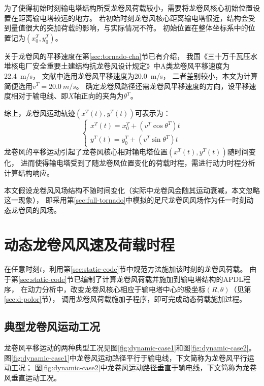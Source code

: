 为了使得初始时刻输电塔结构所受龙卷风荷载较小，需要将龙卷风核心初始位置设置在距离输电塔较远的地方。
若初始时刻龙卷风核心距离输电塔很近，结构会受到量值很大的突加荷载的影响，与实际情况不符。
初始位置在整体坐标系中的位置记为$\left(x^T_{0},y^T_{0}\right)$。

关于龙卷风的平移速度在第\ref{sec:tornado-cha}节已有介绍，
我国《三十万千瓦压水堆核电厂安全重要土建结构抗龙卷风设计规定》中A类龙卷风平移速度为\SI{22.4}{m/s}，
文献\cite{savory2001modelling}\cite{hamada2011behaviour}中选用龙卷风平移速度为\SI{20.0}{m/s}，
二者差别较小，本文为计算简便选用$v^T=\SI{20.0}{m/s}$。
确定龙卷风路径还需龙卷风平移速度的方向，设平移速度相对于输电线、即$X$轴正向的夹角为$\theta^T$。

综上，龙卷风运动轨迹$\left(x^T(t),y^T(t)\right)$可表示为：
\begin{equation}
	\begin{cases}
		x^T(t) = x^T_0 + \left(v^T\cos{\theta^T}\right)t \\
		y^T(t) = y^T_0 + \left(v^T\sin{\theta^T}\right)t 
	\end{cases}
\end{equation}
龙卷风的平移运动引起了龙卷风核心相对输电塔位置$\left(x^T(t),y^T(t)\right)$随时间变化，
进而使得输电塔受到了随龙卷风位置变化的荷载时程，需进行动力时程分析计算结构响应。

本文假设龙卷风风场结构不随时间变化（实际中龙卷风会随其运动衰减，本文忽略这一现象），
即采用第\ref{sec:full-tornado}中模拟的足尺龙卷风风场作为任一时刻动态龙卷风的风场。

\section{动态龙卷风风速及荷载时程}

在任意时刻$t$，利用第\ref{sec:static-code}节中规范方法施加该时刻的龙卷风荷载。
由于第\ref{sec:static-code}节已编制了计算龙卷风荷载并施加到输电塔结构的APDL程序，
在动力分析中，改变龙卷风核心相应于输电塔中心的极坐标$(R,\theta)$（见第\ref{sec:d-polor}节），
调用龙卷风荷载施加子程序，即可完成动态荷载施加过程。

\subsection{典型龙卷风运动工况}

龙卷风平移运动的两种典型工况见图\ref{fig:dynamic-case1}和图\ref{fig:dynamic-case2}。
图\ref{fig:dynamic-case1}中龙卷风运动路径平行于输电线，下文简称为龙卷风平行运动工况；
图\ref{fig:dynamic-case2}中龙卷风运动路径垂直于输电线，下文简称为龙卷风垂直运动工况。

